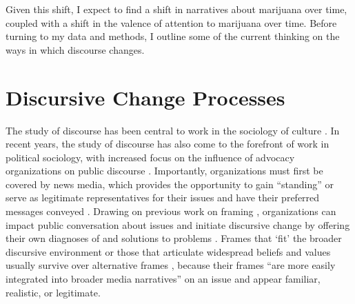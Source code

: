 Given this shift, I expect to find a shift in narratives about marijuana over time, coupled with a shift in the valence of attention to marijuana over time. Before turning to my data and methods, I outline some of the current thinking on the ways in which discourse changes. 




%

%







\section{Discursive Change Processes}

The study of discourse has been central to work in the sociology of culture \citep{dimaggio_1997,swidler_1986,lamont_1992}. In recent years, the study of discourse has also come to the forefront of work in political sociology, with increased focus on the influence of advocacy organizations on public discourse \citep{bail_2012,earl_2004,mccammon_et_al_2007,ghaziani_and_baldassarri_2011,vasi_et_al_2015,gamson_and_modigliani_1989,andrews_and_caren_2010}. Importantly, organizations must first be covered by news media, which provides the opportunity to gain ``standing'' or serve as legitimate representatives for their issues and have their preferred messages conveyed \citep{amenta_et_al_2012,ferree_et_al_2002,elliott_et_al_2016}. Drawing on previous work on framing \citep{goffman_1974,benford_and_snow_2000}, organizations can impact public conversation about issues \citep{bail_et_al_2017} and initiate discursive change by offering their own diagnoses of and solutions to problems \citep{bail_2012,snow_et_al_2007,benford_and_snow_2000}. Frames that `fit' the broader discursive environment \citep{mccammon_et_al_2007} or those that articulate widespread beliefs and values usually survive over alternative frames \citep{mccammon_et_al_2001,snow_et_al_2007,gamson_and_modigliani_1989}, because their frames ``are more easily integrated into broader media narratives'' on an issue \citep[858]{bail_2012} and appear familiar, realistic, or legitimate. 



